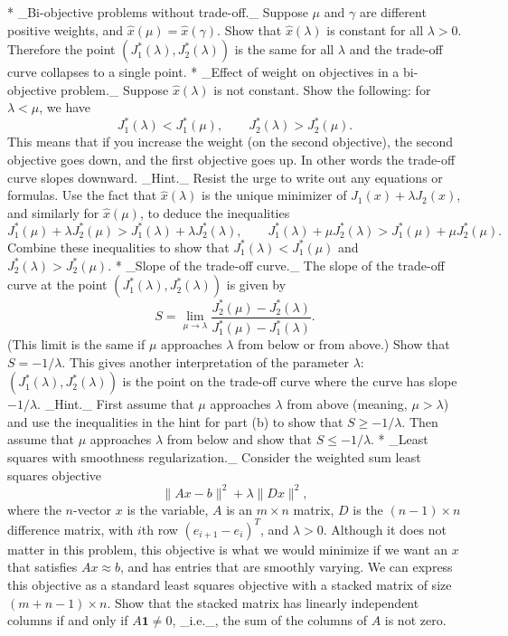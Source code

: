 * _Bi-objective problems without trade-off._ Suppose \(\mu\) and \(\gamma\) are different positive weights, and \(\hat{x}(\mu)=\hat{x}(\gamma)\). Show that \(\hat{x}(\lambda)\) is constant for all \(\lambda>0\). Therefore the point \((J_{1}^{*}(\lambda),J_{2}^{*}(\lambda))\) is the same for all \(\lambda\) and the trade-off curve collapses to a single point.
* _Effect of weight on objectives in a bi-objective problem._ Suppose \(\hat{x}(\lambda)\) is not constant. Show the following: for \(\lambda<\mu\), we have \[J_{1}^{*}(\lambda)<J_{1}^{*}(\mu),\qquad J_{2}^{*}(\lambda)>J_{2}^{*}(\mu).\] This means that if you increase the weight (on the second objective), the second objective goes down, and the first objective goes up. In other words the trade-off curve slopes downward. _Hint._ Resist the urge to write out any equations or formulas. Use the fact that \(\hat{x}(\lambda)\) is the unique minimizer of \(J_{1}(x)+\lambda J_{2}(x)\), and similarly for \(\hat{x}(\mu)\), to deduce the inequalities \[J_{1}^{*}(\mu)+\lambda J_{2}^{*}(\mu)>J_{1}^{*}(\lambda)+\lambda J_{2}^{*}( \lambda),\qquad J_{1}^{*}(\lambda)+\mu J_{2}^{*}(\lambda)>J_{1}^{*}(\mu)+\mu J _{2}^{*}(\mu).\] Combine these inequalities to show that \(J_{1}^{*}(\lambda)<J_{1}^{*}(\mu)\) and \(J_{2}^{*}(\lambda)>J_{2}^{*}(\mu)\).
* _Slope of the trade-off curve._ The slope of the trade-off curve at the point \((J_{1}^{*}(\lambda),J_{2}^{*}(\lambda))\) is given by \[S=\lim_{\mu\to\lambda}\frac{J_{2}^{*}(\mu)-J_{2}^{*}(\lambda)}{J_{1}^{*}(\mu) -J_{1}^{*}(\lambda)}.\] (This limit is the same if \(\mu\) approaches \(\lambda\) from below or from above.) Show that \(S=-1/\lambda\). This gives another interpretation of the parameter \(\lambda\): \((J_{1}^{*}(\lambda),J_{2}^{*}(\lambda))\) is the point on the trade-off curve where the curve has slope \(-1/\lambda\). _Hint._ First assume that \(\mu\) approaches \(\lambda\) from above (meaning, \(\mu>\lambda\)) and use the inequalities in the hint for part (b) to show that \(S\geq-1/\lambda\). Then assume that \(\mu\) approaches \(\lambda\) from below and show that \(S\leq-1/\lambda\).
* _Least squares with smoothness regularization._ Consider the weighted sum least squares objective \[\|Ax-b\|^{2}+\lambda\|Dx\|^{2},\] where the \(n\)-vector \(x\) is the variable, \(A\) is an \(m\times n\) matrix, \(D\) is the \((n-1)\times n\) difference matrix, with \(i\)th row \((e_{i+1}-e_{i})^{T}\), and \(\lambda>0\). Although it does not matter in this problem, this objective is what we would minimize if we want an \(x\) that satisfies \(Ax\approx b\), and has entries that are smoothly varying. We can express this objective as a standard least squares objective with a stacked matrix of size \((m+n-1)\times n\). Show that the stacked matrix has linearly independent columns if and only if \(A\mathbf{1}\neq 0\), _i.e._, the sum of the columns of \(A\) is not zero.
